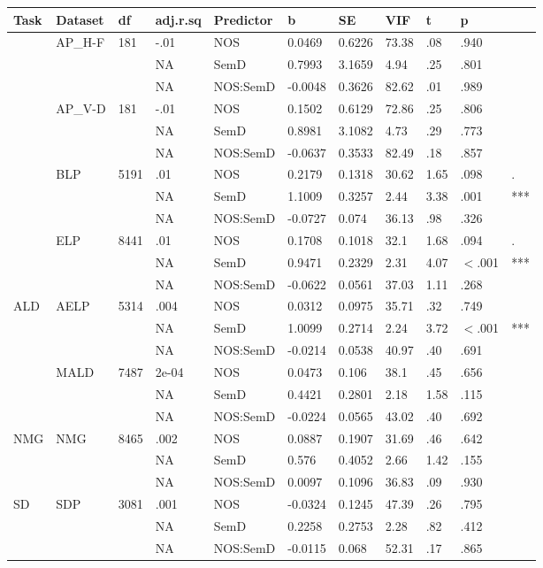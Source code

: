 \begin{table}[ht]
\centering
\begingroup\normalsize
\begin{tabular}{lllllllllll}
  \hline
Task & Dataset & df & adj.r.sq & Predictor & b & SE & VIF & t & p &  \\ 
  \hline
 & AP\_H-F & 181 & -.01 & NOS & 0.0469 & 0.6226 & 73.38 & .08 & .940 &   \\ 
   &  &  & NA & SemD & 0.7993 & 3.1659 & 4.94 & .25 & .801 &   \\ 
   &  &  & NA & NOS:SemD & -0.0048 & 0.3626 & 82.62 & .01 & .989 &   \\ 
   & AP\_V-D & 181 & -.01 & NOS & 0.1502 & 0.6129 & 72.86 & .25 & .806 &   \\ 
   &  &  & NA & SemD & 0.8981 & 3.1082 & 4.73 & .29 & .773 &   \\ 
   &  &  & NA & NOS:SemD & -0.0637 & 0.3533 & 82.49 & .18 & .857 &   \\ 
   & BLP & 5191 & .01 & NOS & 0.2179 & 0.1318 & 30.62 & 1.65 & .098 & . \\ 
   &  &  & NA & SemD & 1.1009 & 0.3257 & 2.44 & 3.38 & .001 & *** \\ 
   &  &  & NA & NOS:SemD & -0.0727 & 0.074 & 36.13 & .98 & .326 &   \\ 
   & ELP & 8441 & .01 & NOS & 0.1708 & 0.1018 & 32.1 & 1.68 & .094 & . \\ 
   &  &  & NA & SemD & 0.9471 & 0.2329 & 2.31 & 4.07 & $<$.001 & *** \\ 
   &  &  & NA & NOS:SemD & -0.0622 & 0.0561 & 37.03 & 1.11 & .268 &   \\ 
  ALD & AELP & 5314 & .004 & NOS & 0.0312 & 0.0975 & 35.71 & .32 & .749 &   \\ 
   &  &  & NA & SemD & 1.0099 & 0.2714 & 2.24 & 3.72 & $<$.001 & *** \\ 
   &  &  & NA & NOS:SemD & -0.0214 & 0.0538 & 40.97 & .40 & .691 &   \\ 
   & MALD & 7487 & 2e-04 & NOS & 0.0473 & 0.106 & 38.1 & .45 & .656 &   \\ 
   &  &  & NA & SemD & 0.4421 & 0.2801 & 2.18 & 1.58 & .115 &   \\ 
   &  &  & NA & NOS:SemD & -0.0224 & 0.0565 & 43.02 & .40 & .692 &   \\ 
  NMG & NMG & 8465 & .002 & NOS & 0.0887 & 0.1907 & 31.69 & .46 & .642 &   \\ 
   &  &  & NA & SemD & 0.576 & 0.4052 & 2.66 & 1.42 & .155 &   \\ 
   &  &  & NA & NOS:SemD & 0.0097 & 0.1096 & 36.83 & .09 & .930 &   \\ 
  SD & SDP & 3081 & .001 & NOS & -0.0324 & 0.1245 & 47.39 & .26 & .795 &   \\ 
   &  &  & NA & SemD & 0.2258 & 0.2753 & 2.28 & .82 & .412 &   \\ 
   &  &  & NA & NOS:SemD & -0.0115 & 0.068 & 52.31 & .17 & .865 &   \\ 
   \hline
\end{tabular}
\endgroup
\end{table}
